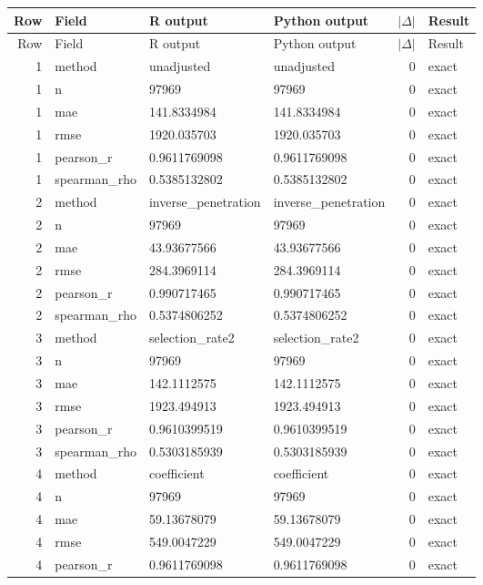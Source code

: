 \documentclass[10pt]{article}
\begin{document}
\small
\begin{longtable}{@{}r p{}p{}p{}rl@{}}
\toprule
Row & Field & R output & Python output & $|\Delta|$ & Result \\
\midrule
\endfirsthead
\toprule
Row & Field & R output & Python output & $|\Delta|$ & Result \\
\midrule
\endhead
1 & method & unadjusted & unadjusted & 0 & exact \\
1 & n & 97969 & 97969 & 0 & exact \\
1 & mae & 141.8334984 & 141.8334984 & 0 & exact \\
1 & rmse & 1920.035703 & 1920.035703 & 0 & exact \\
1 & pearson\_\allowbreak{}r & 0.9611769098 & 0.9611769098 & 0 & exact \\
1 & spearman\_\allowbreak{}rho & 0.5385132802 & 0.5385132802 & 0 & exact \\
2 & method & inverse\_\allowbreak{}penetration & inverse\_\allowbreak{}penetration & 0 & exact \\
2 & n & 97969 & 97969 & 0 & exact \\
2 & mae & 43.93677566 & 43.93677566 & 0 & exact \\
2 & rmse & 284.3969114 & 284.3969114 & 0 & exact \\
2 & pearson\_\allowbreak{}r & 0.990717465 & 0.990717465 & 0 & exact \\
2 & spearman\_\allowbreak{}rho & 0.5374806252 & 0.5374806252 & 0 & exact \\
3 & method & selection\_\allowbreak{}rate2 & selection\_\allowbreak{}rate2 & 0 & exact \\
3 & n & 97969 & 97969 & 0 & exact \\
3 & mae & 142.1112575 & 142.1112575 & 0 & exact \\
3 & rmse & 1923.494913 & 1923.494913 & 0 & exact \\
3 & pearson\_\allowbreak{}r & 0.9610399519 & 0.9610399519 & 0 & exact \\
3 & spearman\_\allowbreak{}rho & 0.5303185939 & 0.5303185939 & 0 & exact \\
4 & method & coefficient & coefficient & 0 & exact \\
4 & n & 97969 & 97969 & 0 & exact \\
4 & mae & 59.13678079 & 59.13678079 & 0 & exact \\
4 & rmse & 549.0047229 & 549.0047229 & 0 & exact \\
4 & pearson\_\allowbreak{}r & 0.9611769098 & 0.9611769098 & 0 & exact \\

\end{longtable}
\end{document}
